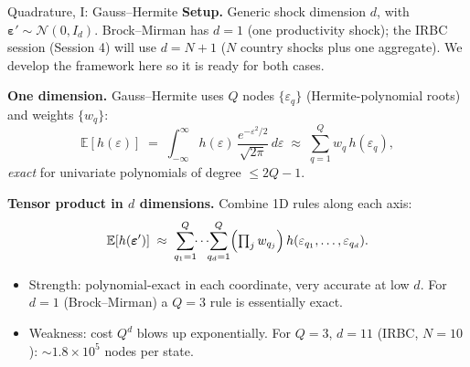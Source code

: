 \documentclass[aspectratio=169,11pt]{beamer}
\newcommand{\emphc}[1]{\textcolor{harvardcrimson}{#1}}
\newcommand{\E}[1]{\mathbb{E}\!\left[#1\right]}
\begin{document}
\begin{frame}{Quadrature, I: Gauss--Hermite}
\footnotesize
\textbf{Setup.} Generic shock dimension $d$, with $\bm\varepsilon' \sim \mathcal{N}(0, I_d)$.  Brock--Mirman has $d=1$ (one productivity shock); the IRBC session (Session 4) will use $d=N+1$ ($N$ country shocks plus one aggregate).  We develop the framework here so it is ready for both cases.

\vspace{0.3em}
\textbf{One dimension.} Gauss--Hermite uses $Q$ nodes $\{\varepsilon_q\}$ (Hermite-polynomial roots) and weights $\{w_q\}$:
\[
\E{h(\varepsilon)} \;=\; \int_{-\infty}^{\infty} h(\varepsilon)\,\frac{e^{-\varepsilon^2/2}}{\sqrt{2\pi}}\,d\varepsilon \;\approx\; \sum_{q=1}^{Q} w_q\, h(\varepsilon_q),
\]
\emph{exact} for univariate polynomials of degree $\le 2Q-1$.

\vspace{0.3em}
\textbf{Tensor product in $d$ dimensions.} Combine 1D rules along each axis:
\[
\E{h(\bm\varepsilon')} \;\approx\; \sum_{q_1=1}^{Q}\!\!\cdots\!\!\sum_{q_d=1}^{Q} \Bigl(\textstyle\prod_{j} w_{q_j}\Bigr)\, h(\varepsilon_{q_1}, \ldots, \varepsilon_{q_d}).
\]
\vspace{-0.4em}
\begin{itemize}\itemsep1pt
    \item \emphc{Strength:} polynomial-exact in each coordinate, very accurate at low $d$.  For $d=1$ (Brock--Mirman) a $Q=3$ rule is essentially exact.
    \item \emphc{Weakness:} cost $Q^{d}$ blows up exponentially. For $Q=3$, $d=11$ (IRBC, $N=10$): $\sim 1.8\times 10^5$ nodes per state.
\end{itemize}
\end{frame}
\end{document}
